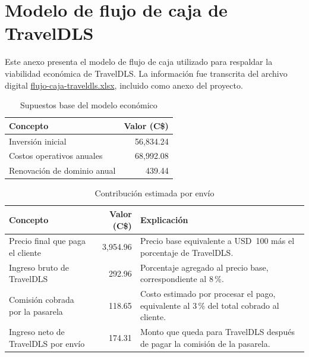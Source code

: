 \clearpage
\appendix

\section{Modelo de flujo de caja de TravelDLS}
\label{anexo:flujo-caja}

Este anexo presenta el modelo de flujo de caja utilizado para respaldar la viabilidad económica de TravelDLS. La información fue transcrita del archivo digital \href{run:anexos/flujo-caja-traveldls.xlsx}{flujo-caja-traveldls.xlsx}, incluido como anexo del proyecto.

\begin{table}[H]
\centering
\caption{Supuestos base del modelo económico}
\label{tab:anexo-supuestos-economicos}
\begin{tabularx}{\textwidth}{>{\RaggedRight\arraybackslash}X r}
\toprule
Concepto & Valor (C\$) \\
\midrule
Inversión inicial & 56,834.24 \\
Costos operativos anuales & 68,992.08 \\
Renovación de dominio anual & 439.44 \\
\bottomrule
\end{tabularx}
\end{table}

\begin{table}[H]
\centering
\caption{Contribución estimada por envío}
\label{tab:anexo-contribucion-envio}
\begin{tabularx}{\textwidth}{>{\RaggedRight\arraybackslash}X r >{\RaggedRight\arraybackslash}X}
\toprule
Concepto & Valor (C\$) & Explicación \\
\midrule
Precio final que paga el cliente & 3,954.96 & Precio base equivalente a USD~100 más el porcentaje de TravelDLS. \\
Ingreso bruto de TravelDLS & 292.96 & Porcentaje agregado al precio base, correspondiente al 8\,\%. \\
Comisión cobrada por la pasarela & 118.65 & Costo estimado por procesar el pago, equivalente al 3\,\% del total cobrado al cliente. \\
Ingreso neto de TravelDLS por envío & 174.31 & Monto que queda para TravelDLS después de pagar la comisión de la pasarela. \\
\bottomrule
\end{tabularx}
\end{table}

